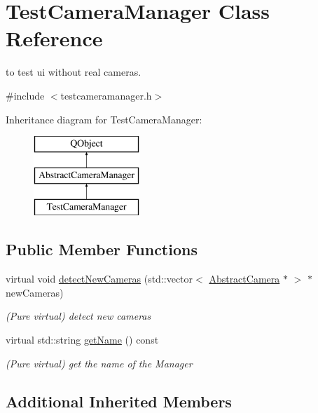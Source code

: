 \hypertarget{class_test_camera_manager}{\section{Test\-Camera\-Manager Class Reference}
\label{class_test_camera_manager}
}


to test ui without real cameras.  




{\ttfamily \#include $<$testcameramanager.\-h$>$}

Inheritance diagram for Test\-Camera\-Manager\-:\begin{figure}[H]
\begin{center}
\leavevmode
\includegraphics[height=3.000000cm]{class_test_camera_manager}
\end{center}
\end{figure}
\subsection*{Public Member Functions}
\begin{DoxyCompactItemize}
\item 
virtual void \hyperlink{class_test_camera_manager_a06c6f51030a289253f2ea214d1475c26}{detect\-New\-Cameras} (std\-::vector$<$ \hyperlink{class_abstract_camera}{Abstract\-Camera} $\ast$ $>$ $\ast$new\-Cameras)
\begin{DoxyCompactList}\small\item\em (Pure virtual) detect new cameras \end{DoxyCompactList}\item 
virtual std\-::string \hyperlink{class_test_camera_manager_adb2da700417695044c0bf1ba2ab21cf3}{get\-Name} () const 
\begin{DoxyCompactList}\small\item\em (Pure virtual) get the name of the Manager \end{DoxyCompactList}\end{DoxyCompactItemize}
\subsection*{Additional Inherited Members}


